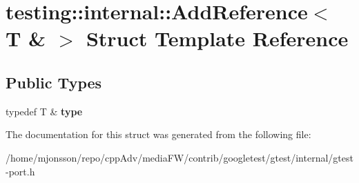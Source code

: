 \hypertarget{structtesting_1_1internal_1_1AddReference_3_01T_01_6_01_4}{}\section{testing\+:\+:internal\+:\+:Add\+Reference$<$ T \& $>$ Struct Template Reference}
\label{structtesting_1_1internal_1_1AddReference_3_01T_01_6_01_4}
\subsection*{Public Types}
\begin{DoxyCompactItemize}
\item 
\mbox{\label{structtesting_1_1internal_1_1AddReference_3_01T_01_6_01_4_a93c064cdcdaced0abd167258425e57af}} 
typedef T \& {\bfseries type}
\end{DoxyCompactItemize}


The documentation for this struct was generated from the following file\+:\begin{DoxyCompactItemize}
\item 
/home/mjonsson/repo/cpp\+Adv/media\+F\+W/contrib/googletest/gtest/internal/gtest-\/port.\+h\end{DoxyCompactItemize}
